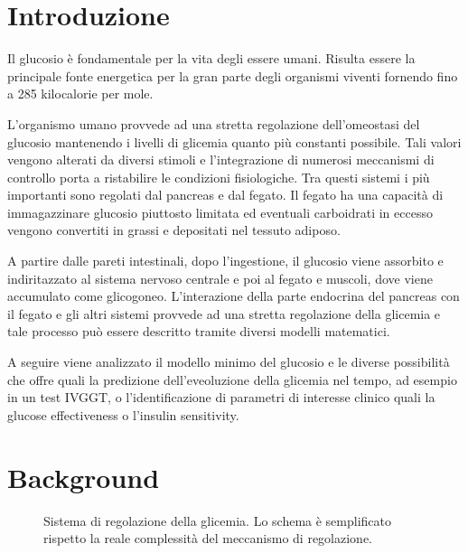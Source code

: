 \section{Introduzione}

Il glucosio è fondamentale per la vita degli essere umani. Risulta essere la principale fonte energetica per la gran parte degli organismi viventi fornendo fino a 285 kilocalorie per mole. 

L'organismo umano provvede ad una stretta regolazione dell'omeostasi del glucosio mantenendo i livelli di glicemia quanto più constanti possibile. Tali valori vengono alterati da diversi stimoli e l'integrazione di numerosi meccanismi di controllo porta a ristabilire le condizioni fisiologiche.
Tra questi sistemi i più importanti sono regolati dal pancreas e dal fegato.
Il fegato ha una capacità di immagazzinare glucosio piuttosto limitata ed eventuali carboidrati in eccesso vengono convertiti in grassi e depositati nel tessuto adiposo. 

A partire dalle pareti intestinali, dopo l'ingestione, il glucosio viene assorbito e indiritazzato al sistema nervoso centrale e poi al fegato e muscoli, dove viene accumulato come glicogoneo. 
L'interazione della parte endocrina del pancreas con il fegato e gli altri sistemi provvede ad una stretta regolazione della glicemia e tale processo può essere descritto tramite diversi modelli matematici.

A seguire viene analizzato il modello minimo del glucosio e le diverse possibilità che offre quali la predizione dell'eveoluzione della glicemia nel tempo, ad esempio in un test IVGGT, o l'identificazione di parametri di interesse clinico quali la glucose effectiveness o l'insulin sensitivity. 

\section{Background}

\begin{figure}[t!]
	\centering
	\scriptsize{\def\svgwidth{0.95\linewidth}
		}
	\caption{Sistema di regolazione della glicemia. Lo schema è semplificato rispetto la reale complessità del meccanismo di regolazione.}
	\label{fig:glucoseregolation}
\end{figure}


